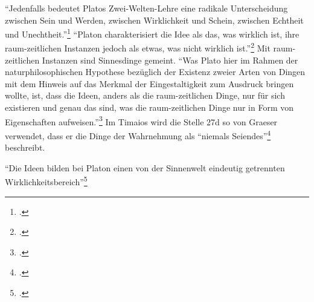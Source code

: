 \enquote{Jedenfalls bedeutet Platos Zwei-Welten-Lehre eine radikale Unterscheidung zwischen Sein und Werden, zwischen Wirklichkeit und Schein, zwischen Echtheit und Unechtheit.}\footcite[][S. 134]{GraeserPhiloGeschichte}
\enquote{Platon charakterisiert die Idee als das, was wirklich ist, ihre raum-zeitlichen Instanzen jedoch als etwas, was nicht wirklich ist.}\footcite[][S. 139]{GraeserPhiloGeschichte} Mit raum-zeitlichen Instanzen sind Sinnesdinge gemeint. 
\enquote{Was Plato hier im Rahmen der naturphilosophischen Hypothese bezüglich der Existenz zweier Arten von Dingen mit dem Hinweis auf das Merkmal der Eingestaltigkeit zum Ausdruck bringen wollte, ist, dass die Ideen, anders als die raum-zeitlichen Dinge, nur für sich existieren und genau das sind, was die raum-zeitlichen Dinge nur in Form von Eigenschaften aufweisen.}\footcite[][S. 140]{GraeserPhiloGeschichte}
Im Timaios wird die Stelle 27d so von Graeser verwendet, dass er die Dinge der Wahrnehmung als \enquote{niemals Seiendes}\footcite[vgl.][S. 140]{GraeserPhiloGeschichte} beschreibt.

\enquote{Die Ideen bilden bei Platon einen von der Sinnenwelt eindeutig getrennten Wirklichkeitsbereich}\footcite[][S. 31]{DisseMetaphysik}


